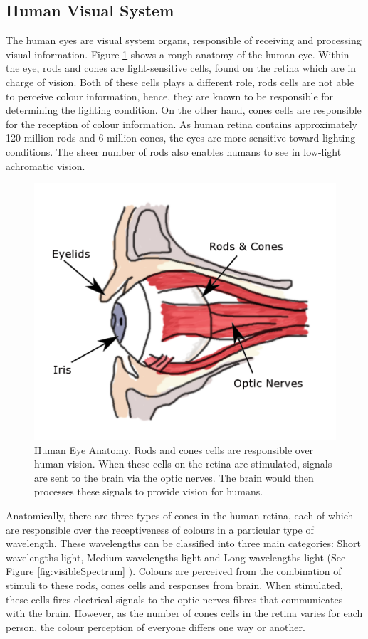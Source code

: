 \subsection{Human Visual System}
\label{section:eyes}
The human eyes are visual system organs, responsible of receiving and processing visual information. Figure \ref{fig:eyes} shows a rough anatomy of the human eye. Within the eye, rods and cones are light-sensitive cells, found on the retina which are in charge of vision. Both of these cells plays a different role, rods cells are not able to perceive colour information, hence, they are known to be responsible for determining the lighting condition. On the other hand, cones cells are responsible for the reception of colour information. As human retina contains approximately 120 million rods and 6 million cones, the eyes are more sensitive toward lighting conditions. The sheer number of rods also enables humans to see in low-light achromatic vision. 


\begin{figure}[hbt!]\centering
\includegraphics[width=.5\textwidth]{image/lit/rodsandconscolored.png}
\caption[Human Eye Anatomy]{Human Eye Anatomy. Rods and cones cells are responsible over human vision. When these cells on the retina are stimulated, signals are sent to the brain via the optic nerves. The brain would then processes these signals to provide vision for humans.}
\label{fig:eyes}
\end{figure}

Anatomically, there are three types of cones in the human retina, each of which are responsible over the receptiveness of colours in a particular type of wavelength. These wavelengths can be classified into three main categories: Short wavelengths light, Medium  wavelengths light and Long wavelengths light (See Figure \ref{fig:visibleSpectrum} \cite{eyespectrum}). Colours are perceived from the combination of stimuli to these rods, cones cells and responses from brain. When stimulated, these cells fires electrical signals to the optic nerves fibres that communicates with the brain. However, as the number of cones cells in the retina varies for each person, the colour perception of everyone differs one way or another.


